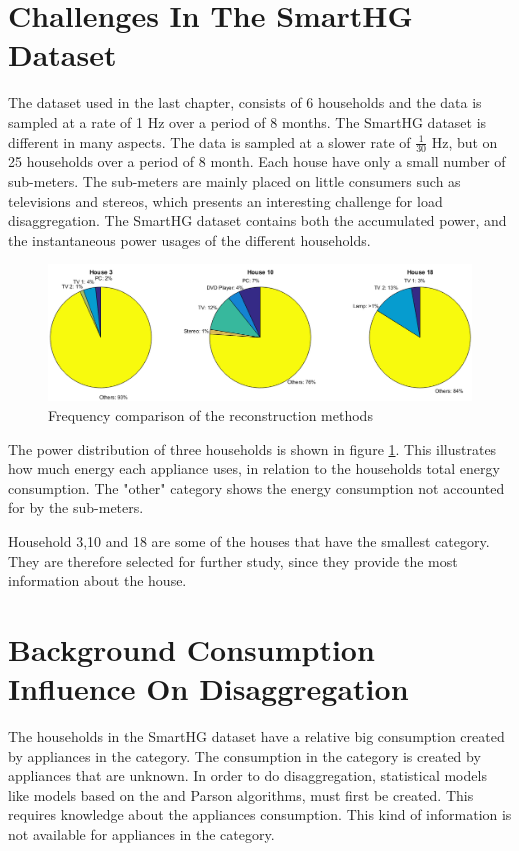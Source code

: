 \section{Challenges In The SmartHG Dataset} 
The  dataset used in the last chapter, consists of 6 households and the data is sampled at a rate of 1 Hz over a period of 8 months. The SmartHG dataset is different in many aspects. The data is sampled at a slower rate of $\frac{1}{30}$ Hz, but on 25 households over a period of 8 month. Each house have only a small number of sub-meters. The sub-meters are mainly placed on little consumers such as televisions and stereos, which presents an interesting challenge for load disaggregation. The SmartHG dataset contains both the accumulated power, and the instantaneous power usages of the different households.

\begin{figure}[H]
\centering
\includegraphics[width=1\textwidth]{billeder/TotalPie.png}
\caption{Frequency comparison of the reconstruction methods}
\label{fig:SLC}
\end{figure}

The power distribution of three households is shown in figure \ref{fig:SLC}. This illustrates how much energy each appliance uses, in relation to the households total energy consumption. The "other" category shows the energy consumption not accounted for by the sub-meters.  

Household 3,10 and 18 are some of the houses that have the smallest  category. They are therefore selected for further study, since they provide the most information about the house. 

\section{Background Consumption Influence On Disaggregation}
\label{sec:AppNoise}
The households in the SmartHG dataset have a relative big consumption created by appliances in the  category. The consumption in the  category is created by appliances that are unknown. In order to do disaggregation, statistical models like models based on the  and Parson algorithms, must first be created. This requires knowledge about the appliances consumption. This kind of information is not available for appliances in the  category. 

